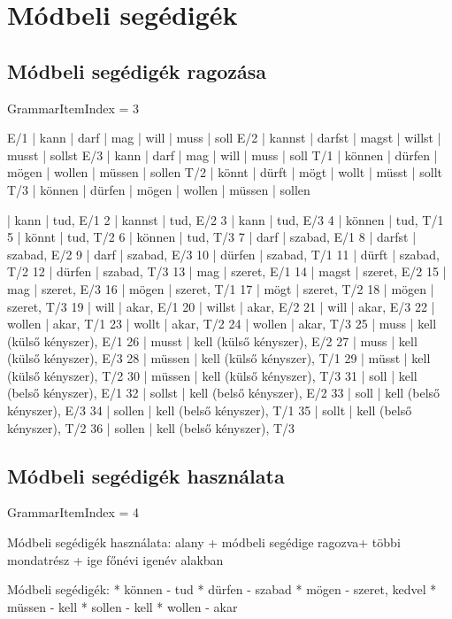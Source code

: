 \documentclass{article}
\newenvironment{desc}{\verbatim}{\endverbatim}
\newenvironment{exmp}{\verbatim}{\endverbatim}
\begin{document}
\section{Módbeli segédigék}

\subsection{Módbeli segédigék ragozása}

GrammarItemIndex = 3

\begin{desc}
E/1 | kann   | darf   | mag   | will   | muss   | soll 
E/2 | kannst | darfst | magst | willst | musst  | sollst 
E/3 | kann   | darf   | mag   | will   | muss   | soll 
T/1 | können | dürfen | mögen | wollen | müssen | sollen 
T/2 | könnt  | dürft  | mögt  | wollt  | müsst  | sollt 
T/3 | können | dürfen | mögen | wollen | müssen | sollen 
\end{desc}

\begin{exmp}
1 | kann | tud, E/1
2 | kannst | tud, E/2
3 | kann | tud, E/3
4 | können | tud, T/1
5 | könnt | tud, T/2
6 | können | tud, T/3
7 | darf | szabad, E/1
8 | darfst | szabad, E/2
9 | darf | szabad, E/3
10 | dürfen | szabad, T/1
11 | dürft | szabad, T/2
12 | dürfen | szabad, T/3
13 | mag | szeret, E/1
14 | magst | szeret, E/2
15 | mag | szeret, E/3
16 | mögen | szeret, T/1
17 | mögt | szeret, T/2
18 | mögen | szeret, T/3
19 | will | akar, E/1
20 | willst | akar, E/2
21 | will | akar, E/3
22 | wollen | akar, T/1
23 | wollt | akar, T/2
24 | wollen | akar, T/3
25 | muss | kell (külső kényszer), E/1
26 | musst | kell (külső kényszer), E/2
27 | muss | kell (külső kényszer), E/3
28 | müssen | kell (külső kényszer), T/1
29 | müsst | kell (külső kényszer), T/2
30 | müssen | kell (külső kényszer), T/3
31 | soll | kell (belső kényszer), E/1
32 | sollst | kell (belső kényszer), E/2
33 | soll | kell (belső kényszer), E/3
34 | sollen | kell (belső kényszer), T/1
35 | sollt | kell (belső kényszer), T/2
36 | sollen | kell (belső kényszer), T/3
\end{exmp}

\subsection{Módbeli segédigék használata}

GrammarItemIndex = 4

\begin{desc}
Módbeli segédigék használata:
alany + módbeli segédige ragozva+ többi mondatrész + ige főnévi igenév alakban 

Módbeli segédigék:
* können - tud
* dürfen - szabad
* mögen - szeret, kedvel
* müssen - kell
* sollen - kell
* wollen - akar
\end{desc}
\end{document}
